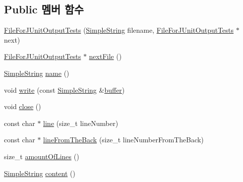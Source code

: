 \subsection*{Public 멤버 함수}
\begin{DoxyCompactItemize}
\item 
\hyperlink{class_file_for_j_unit_output_tests_af2ba8e43506a1302c2bed9f9b0122719}{File\+For\+J\+Unit\+Output\+Tests} (\hyperlink{class_simple_string}{Simple\+String} filename, \hyperlink{class_file_for_j_unit_output_tests}{File\+For\+J\+Unit\+Output\+Tests} $\ast$next)
\item 
\hyperlink{class_file_for_j_unit_output_tests}{File\+For\+J\+Unit\+Output\+Tests} $\ast$ \hyperlink{class_file_for_j_unit_output_tests_ad765f924ce0771dcf0733b47eaa63895}{next\+File} ()
\item 
\hyperlink{class_simple_string}{Simple\+String} \hyperlink{class_file_for_j_unit_output_tests_a7f5c62315a3ba3d6e42280d5794eca55}{name} ()
\item 
void \hyperlink{class_file_for_j_unit_output_tests_a972dcdc32d7fa26e9f7dc64c68304405}{write} (const \hyperlink{class_simple_string}{Simple\+String} \&\hyperlink{_hello_test_8cpp_a8be6d469a7cd1c8d66cc6d2d1e10c65b}{buffer})
\item 
void \hyperlink{class_file_for_j_unit_output_tests_a5ae591df94fc66ccb85cbb6565368bca}{close} ()
\item 
const char $\ast$ \hyperlink{class_file_for_j_unit_output_tests_a5d596290bf94a63abd273d45e1507382}{line} (size\+\_\+t line\+Number)
\item 
const char $\ast$ \hyperlink{class_file_for_j_unit_output_tests_a13a9dede858aebe69c5c2cb93af8a1f9}{line\+From\+The\+Back} (size\+\_\+t line\+Number\+From\+The\+Back)
\item 
size\+\_\+t \hyperlink{class_file_for_j_unit_output_tests_af5a9eb30c0426da6e5a18f14d41db8c9}{amount\+Of\+Lines} ()
\item 
\hyperlink{class_simple_string}{Simple\+String} \hyperlink{class_file_for_j_unit_output_tests_a14befa33f2f0c5dc850fe33f99b12238}{content} ()
\end{DoxyCompactItemize}
